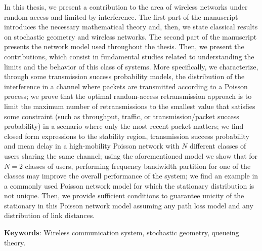 \begin{resumo}
    In this thesis, we present a contribution to the area of wireless networks under random-access and limited by interference.
    The first part of the manuscript introduces the necessary mathematical theory and, then, we state classical results on stochastic geometry and wireless networks.
    The second part of the manuscript presents the network model used throughout the thesis.
    Then, we present the contributions, which consist in fundamental studies related to understanding the limits and the behavior of this class of systems.
    More specifically, we characterize, through some transmission success probability models, the distribution of the interference in a channel where packets are transmitted according to a Poisson process; 
    we prove that the optimal random-access retransmission approach is to limit the maximum number of retransmissions to the smallest value that satisfies some constraint (such as throughput, traffic, or transmission/packet success probability) in a scenario where only the most recent packet matters;
    we find closed form expressions to the stability region, transmission success probability and mean delay in a high-mobility Poisson network with $N$ different classes of users sharing the same channel;
    using the aforementioned model we show that for $N=2$ classes of users, performing frequency bandwidth partition for one of the classes may improve the overall performance of the system;
    we find an example in a commonly used Poisson network model for which the stationary distribution is not unique. Then, we provide sufficient conditions to guarantee unicity of the stationary in this Poisson network model assuming any path loss model and any distribution of link distances.
    \vspace{\onelineskip}

    \noindent\textbf{Keywords}: Wireless communication system, stochastic geometry, queueing theory.

    \vspace{\onelineskip}
    \vspace{\onelineskip}
    \newpage
    

\end{resumo}

